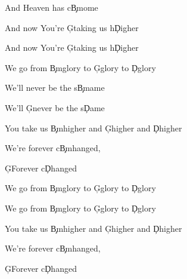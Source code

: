 \documentclass[9pt]{extarticle}
\begin{document}
And Heaven has c\c{Bm}ome

And now You’re \c{G}taking us h\c{D}igher

And now You’re \c{G}taking us h\c{D}igher
\ev

\bc
We go from \c{Bm}glory to \c{G}glory to \c{D}glory

We’ll never be the s\c{Bm}ame

We’ll \c{G}never be the s\c{D}ame

You take us \c{Bm}higher and \c{G}higher and \c{D}higher

We’re forever c\c{Bm}hanged,

\c{G}Forever c\c{D}hanged
\ec

\bc
We go from \c{Bm}glory to \c{G}glory to \c{D}glory

We go from \c{Bm}glory to \c{G}glory to \c{D}glory

You take us \c{Bm}higher and \c{G}higher and \c{D}higher

We’re forever c\c{Bm}hanged,

\c{G}Forever c\c{D}hanged
\ec

\esong
\end{document}
